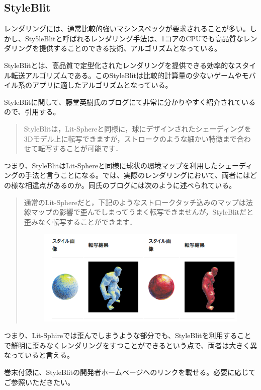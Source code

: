 \documentclass[dvipdfmx]{jsarticle}
\begin{document}
\subsection{StyleBlit}
レンダリングには、通常比較的強いマシンスペックが要求されることが多い。しかし、Sty5leBlitと呼ばれるレンダリング手法は、1コアのCPUでも高品質なレンダリングを提供することのできる技術、アルゴリズムとなっている。\par
StyleBlitとは、高品質で定型化されたレンダリングを提供できる効率的なスタイル転送アルゴリズムである。このStyleBlitは比較的計算量の少ないゲームやモバイル系のアプリに適したアルゴリズムとなっている。\par
StyleBlitに関して、藤堂英樹氏のブログ\cite{bib01}にて非常に分かりやすく紹介されているので、引用する。
\begin{quote}
  StyleBlitは，Lit-Sphereと同様に，球にデザインされたシェーディングを3Dモデル上に転写できますが，ストロークのような細かい特徴まで合わせて転写することが可能です．
\end{quote}
つまり、StyleBlitはLit-Sphereと同様に球状の環境マップを利用したシェーディングの手法と言うことになる。では、実際のレンダリングにおいて、両者にはどの様な相違点があるのか。同氏のブログ\cite{bib01}には次のように述べられている。
\begin{quote}
  通常のLit-Sphereだと，下記のようなストロークタッチ込みのマップは法線マップの影響で歪んでしまってうまく転写できませんが，StyleBlitだと歪みなく転写することができます．
  \begin{figure}[H]
    \centering
    \includegraphics[scale=0.4]{images/todoteacher.png}
  \end{figure}
\end{quote}
つまり、Lit-Sphireでは歪んでしまうような部分でも、StyleBlitを利用することで鮮明に歪みなくレンダリングをすつことができるという点で、両者は大きく異なっていると言える。\par
巻末付録に、StyleBlitの開発者ホームページへのリンクを載せる。必要に応じてご参照いただきたい。
\end{document}
